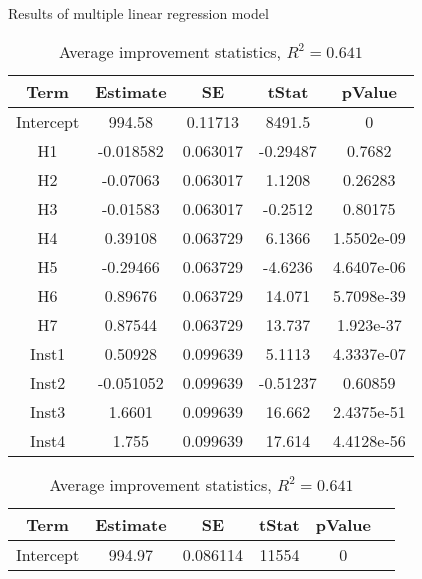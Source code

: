 \documentclass[../main.tex]{subfiles}
\begin{document}
\begin{table}
    \centering
    \caption{Results of multiple linear regression model}
    \begin{adjustbox}{width=\columnwidth,center}
        \begin{subtable}{.75\columnwidth}
            \centering
            \begin{tabular}{ccccc}
            \hline
            Term    &Estimate   & SE    & tStat & pValue \\ 
            \hline                
        Intercept   & 994.58    & 0.11713       & 8491.5    & 0         \\
            H1      & -0.018582 & 0.063017      & -0.29487  & 0.7682    \\
            H2      & -0.07063  & 0.063017      & 1.1208    & 0.26283   \\
            H3      & -0.01583  & 0.063017      & -0.2512   & 0.80175   \\
            H4      & 0.39108   & 0.063729      & 6.1366    & 1.5502e-09\\
            H5      & -0.29466  & 0.063729      & -4.6236   & 4.6407e-06\\
            H6      & 0.89676   & 0.063729      & 14.071    & 5.7098e-39\\
            H7      & 0.87544   & 0.063729      & 13.737    & 1.923e-37 \\
            Inst1   & 0.50928   & 0.099639      & 5.1113    & 4.3337e-07\\
            Inst2   & -0.051052 & 0.099639      & -0.51237  & 0.60859   \\
            Inst3   & 1.6601    & 0.099639      & 16.662    & 2.4375e-51\\
            Inst4   & 1.755     &  0.099639     & 17.614    & 4.4128e-56\\
            \hline
            \end{tabular}
        \caption{Average improvement statistics, $R^2=0.641$}
        \label{tab:regrAvrgNormal}
        \end{subtable}
        \hfill
        \begin{subtable}{.75\columnwidth}
            \centering
            \begin{tabular}{cccccc}
            \hline
            Term    &Estimate   & SE    & tStat & pValue \\ 
            \hline                
        Intercept   & 994.97    & 0.086114      & 11554     & 0         \\

\end{tabular}
\end{subtable}
\end{adjustbox}
\end{table}
\end{document}
